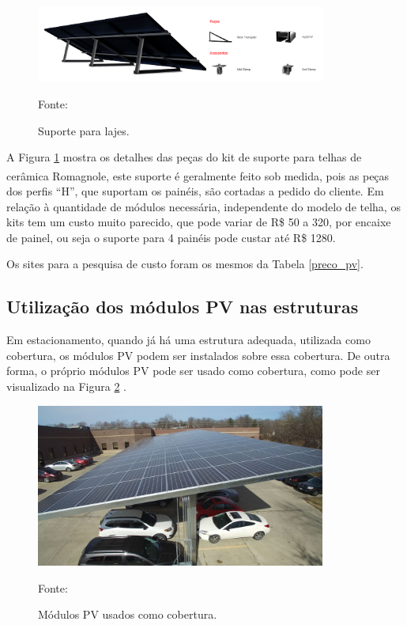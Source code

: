 \begin{figure}[H]
    \centering
    \includegraphics[width=0.85\textwidth]{./Figuras/suporte_laje.png}
    \caption{Suporte para lajes.}{Fonte: \cite{romagnole}}
   \label{fig:suporte_laje}
\end{figure}

A Figura \ref{fig:suporte_laje} mostra os detalhes das peças do kit de suporte para telhas de cerâmica Romagnole\textsuperscript{\textregistered}, este suporte é geralmente feito sob medida, pois as peças dos perfis ``H'', que suportam os painéis, são cortadas a pedido do cliente. Em relação à quantidade de módulos necessária, independente do modelo de telha, os kits tem um custo muito parecido, que pode variar de R\$ 50 a 320, por encaixe de painel, ou seja o suporte para 4 painéis pode custar até R\$ 1280.

Os sites para a pesquisa de custo foram os mesmos da Tabela \ref{preco_pv}.

\subsection{Utilização dos módulos PV nas estruturas}

Em estacionamento, quando já há uma estrutura adequada, utilizada como cobertura, os módulos PV podem ser instalados sobre essa cobertura. De outra forma, o próprio módulos PV pode ser usado como cobertura, como pode ser visualizado na Figura \ref{fig:telhado_pv} .

\begin{figure}[H]
    \centering
    \includegraphics[width=0.85\textwidth]{./Figuras/telhado_pv.jpg}
    \caption{Módulos PV usados como cobertura.}{Fonte: \cite{soliens}}
   \label{fig:telhado_pv}
\end{figure}

